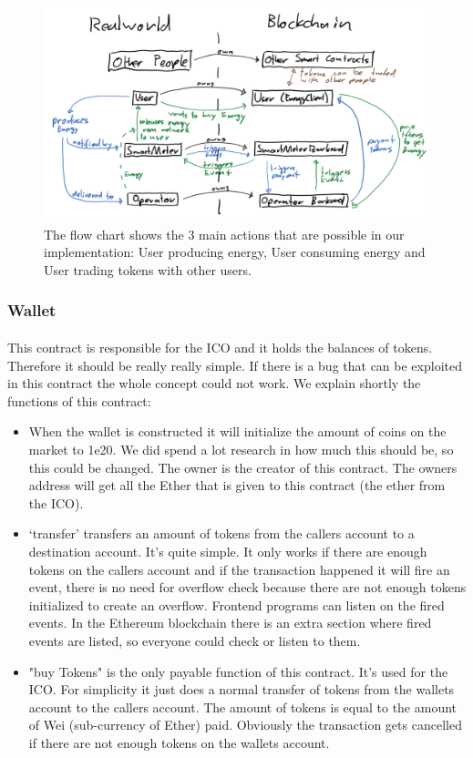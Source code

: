 \documentclass{scrartcl}
\begin{document}
	\begin{figure} [h]
		\centering
		\includegraphics[width=150mm,scale=1.0]{section_4_flow_chart.PNG}
		\caption{The flow chart shows the 3 main actions that are possible in our implementation: User producing energy, User consuming energy and User trading tokens with other users.}
	\end{figure}
	
	\subsubsection{Wallet}
	
	\paragraph{}
	This contract is responsible for the ICO and it holds the balances of tokens. Therefore it should be really really simple. If there is a bug that can be exploited in this contract the whole concept could not work. We explain shortly the functions of this contract:
	
	\begin{itemize}
		\item When the wallet is constructed it will initialize the amount of coins on the market to 1e20. We did spend a lot research in how much this should be, so this could be changed. The owner is the creator of this contract. The owners address will get all the Ether that is given to this contract (the ether from the ICO).
		\item ‘transfer’ transfers an amount of tokens from the callers account to a destination account. It’s quite simple. It only works if there are enough tokens on the callers account and if the transaction happened it will fire an event, there is no need for overflow check because there are not enough tokens initialized to create an overflow. Frontend programs can listen on the fired events. In the Ethereum blockchain there is an extra section where fired events are listed, so everyone could check or listen to them.
		\item "buy Tokens" is the only payable function of this contract. It’s used for the ICO. For simplicity it just does a normal transfer of tokens from the wallets account to the callers account. The amount of tokens is equal to the amount of Wei (sub-currency of Ether) paid. Obviously the transaction gets cancelled if there are not enough tokens on the wallets account.
	\end{itemize}
		
\end{document}
